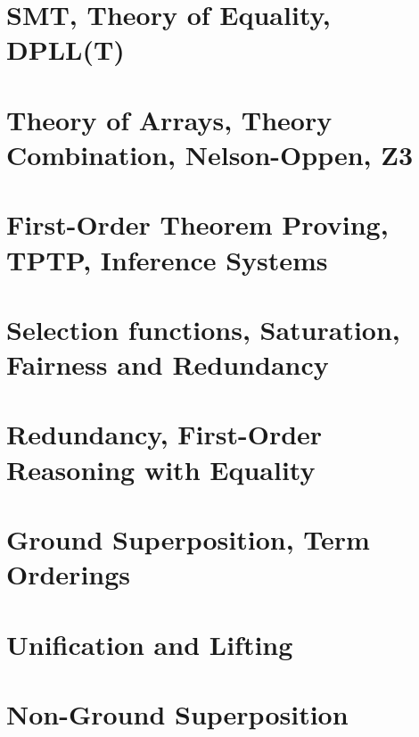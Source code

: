 \documentclass[]{article}
\begin{document}
\section{SMT, Theory of Equality, DPLL(T)}

\section{Theory of Arrays, Theory Combination, Nelson-Oppen, Z3}

\section{First-Order Theorem Proving, TPTP, Inference Systems}

\section{Selection functions, Saturation, Fairness and Redundancy}

\section{Redundancy, First-Order Reasoning with Equality}

\section{Ground Superposition, Term Orderings}

\section{Unification and Lifting}

\section{Non-Ground Superposition}
\end{document}
